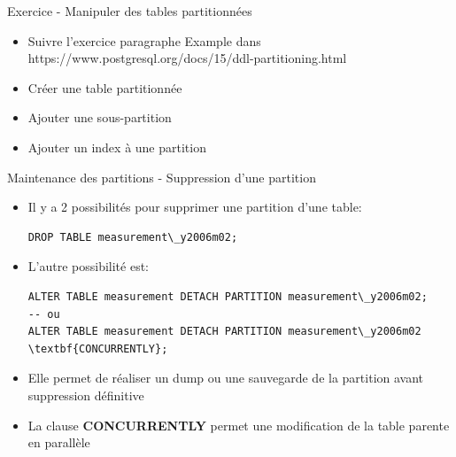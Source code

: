 \begin{frame}[fragile]{Exercice - Manipuler des tables partitionnées}

   \begin{itemize}
      \item Suivre l'exercice paragraphe Example dans https://www.postgresql.org/docs/15/ddl-partitioning.html
      \item Créer une table partitionnée
      \item Ajouter une sous-partition
      \item Ajouter un index à une partition
   \end{itemize}

\end{frame}


\begin{frame}[fragile]{Maintenance des partitions - Suppression d'une partition}

   \begin{itemize}
      \item Il y a 2 possibilités pour supprimer une partition d'une table:
\begin{tiny}
\begin{Verbatim}[commandchars=\\\{\}]
   DROP TABLE measurement\_y2006m02;
\end{Verbatim}
\end{tiny}
      \item L'autre possibilité est:
\begin{tiny}
\begin{Verbatim}[commandchars=\\\{\}]
ALTER TABLE measurement DETACH PARTITION measurement\_y2006m02;
-- ou
ALTER TABLE measurement DETACH PARTITION measurement\_y2006m02 \textbf{CONCURRENTLY};
\end{Verbatim}
\end{tiny}
      \item Elle permet de réaliser un dump ou une sauvegarde de la partition avant suppression définitive
      \item La clause \textbf{CONCURRENTLY} permet une modification de la table parente en parallèle
   \end{itemize}

\end{frame}


